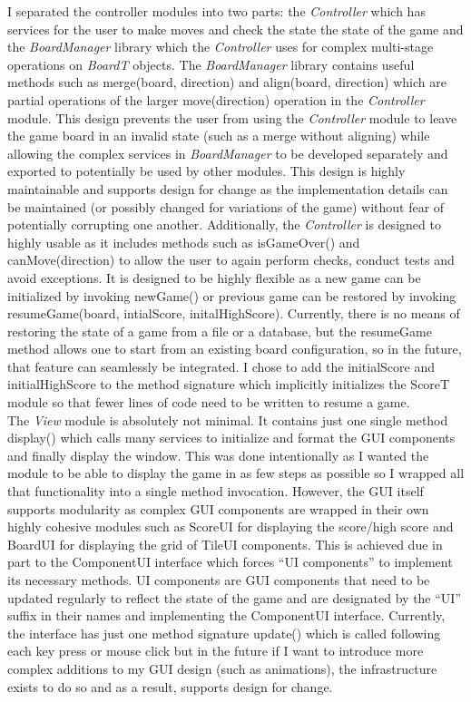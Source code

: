 \documentclass[12pt]{article}
\begin{document}
I separated the controller modules into two parts: the \textit{Controller} which has services for the user to make moves and check the state the state of the game and the \textit{BoardManager} library which the \textit{Controller} uses for complex multi-stage operations on \textit{BoardT} objects. The \textit{BoardManager} library contains useful methods such as merge(board, direction) and align(board, direction) which are partial operations of the larger move(direction) operation in the \textit{Controller} module. This design prevents the user from using the \textit{Controller} module to leave the game board in an invalid state (such as a merge without aligning) while allowing the complex services in \textit{BoardManager} to be developed separately and exported to potentially be used by other modules. This design is highly maintainable and supports design for change as the implementation details can be maintained (or possibly changed for variations of the game) without fear of potentially corrupting one another. Additionally, the \textit{Controller} is designed to highly usable as it includes methods such as isGameOver() and canMove(direction) to allow the user to again perform checks, conduct tests and avoid exceptions. It is designed to be highly flexible as a new game can be initialized by invoking newGame() or previous game can be restored by invoking resumeGame(board, intialScore, initalHighScore). Currently, there is no means of restoring the state of a game from a file or a database, but the resumeGame method allows one to start from an existing board configuration, so in the future, that feature can seamlessly be integrated. I chose to add the initialScore and initialHighScore to the method signature which implicitly initializes the ScoreT module so that fewer lines of code need to be written to resume a game. \\

The \textit{View} module is absolutely not minimal. It contains just one single method display() which calls many services to initialize and format the GUI components and finally display the window. This was done intentionally as I wanted the module to be able to display the game in as few steps as possible so I wrapped all that functionality into a single method invocation. However, the GUI itself supports modularity as complex GUI components are wrapped in their own highly cohesive modules such as ScoreUI for displaying the score/high score and BoardUI for displaying the grid of TileUI components. This is achieved due in part to the ComponentUI interface which forces  ``UI components'' to implement its necessary methods. UI components are GUI components that need to be updated regularly to reflect the state of the game and are designated by the ``UI'' suffix in their names and implementing the ComponentUI interface. Currently, the interface has just one method signature update() which is called following each key press or mouse click but in the future if I want to introduce more complex additions to my GUI design (such as animations), the infrastructure exists to do so and as a result, supports design for change. 
\end{document}
